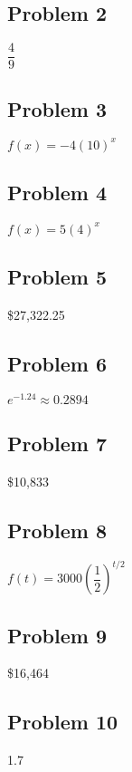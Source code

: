 \documentclass[12pt]{article}
\begin{document}
\subsection*{Problem 2}
\( \dfrac{4}{9} \)

\subsection*{Problem 3}
\( f(x) = -4(10)^x \)

\subsection*{Problem 4}
\( f(x) = 5(4)^x \)

\subsection*{Problem 5}
\$27{,}322.25

\subsection*{Problem 6}
\( e^{-1.24} \approx 0.2894 \)

\subsection*{Problem 7}
\$10{,}833

\subsection*{Problem 8}
\( f(t) = 3000\left(\dfrac{1}{2}\right)^{t/2} \)

\subsection*{Problem 9}
\$16{,}464

\subsection*{Problem 10}
1.7
\end{document}
